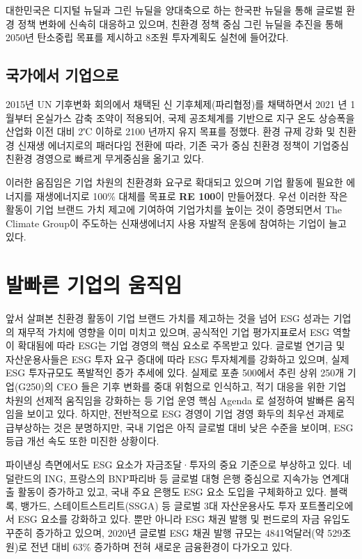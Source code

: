 \documentclass[smallextended]{svjour3}       %
\begin{document}
대한민국은 디지털 뉴딜과 그린 뉴딜을 양대축으로 하는 한국판 뉴딜을 통해
글로벌 환경 정책 변화에 신속히 대응하고 있으며, 친환경 정책 중심 그린
뉴딜을 추진을 통해 2050년 탄소중립 목표를 제시하고 8조원 투자계획도
실천에 들어갔다.

\hypertarget{companies-to-climate-change}{%
\subsection{국가에서 기업으로}\label{companies-to-climate-change}}

2015년 UN 기후변화 회의에서 채택된 신 기후체제(파리협정)를 채택하면서
2021 년 1월부터 온실가스 감축 조약이 적용되어, 국제 공조체계를 기반으로
지구 온도 상승폭을 산업화 이전 대비 2℃ 이하로 2100 년까지 유지 목표를
정했다. 환경 규제 강화 및 친환경 신재생 에너지로의 패러다임 전환에 따라,
기존 국가 중심 친환경 정책이 기업중심 친환경 경영으로 빠르게 무게중심을
옮기고 있다.

이러한 움짐임은 기업 차원의 친환경화 요구로 확대되고 있으며 기업 활동에
필요한 에너지를 재생에너지로 100\% 대체를 목표로 \textbf{RE 100}이
만들어졌다. 우선 이러한 작은 활동이 기업 브랜드 가치 제고에 기여하여
기업가치를 높이는 것이 증명되면서 The Climate Group이 주도하는
신재생에너지 사용 자발적 운동에 참여하는 기업이 늘고 있다.

\hypertarget{movement-company}{%
\section{발빠른 기업의 움직임}\label{movement-company}}

앞서 살펴본 친환경 활동이 기업 브랜드 가치를 제고하는 것을 넘어 ESG
성과는 기업의 재무적 가치에 영향을 이미 미치고 있으며, 공식적인 기업
평가지표로서 ESG 역할이 확대됨에 따라 ESG는 기업 경영의 핵심 요소로
주목받고 있다. 글로벌 연기금 및 자산운용사들은 ESG 투자 요구 증대에 따라
ESG 투자체계를 강화하고 있으며, 실제 ESG 투자규모도 폭발적인 증가 추세에
있다. 실제로 포츈 500에서 추린 상위 250개 기업(G250)의 CEO 들은 기후
변화를 중대 위험으로 인식하고, 적기 대응을 위한 기업 차원의 선제적
움직임을 강화하는 등 기업 운영 핵심 Agenda 로 설정하여 발빠른 움직임을
보이고 있다. 하지만, 전반적으로 ESG 경영이 기업 경영 화두의 최우선
과제로 급부상하는 것은 분명하지만, 국내 기업은 아직 글로벌 대비 낮은
수준을 보이며, ESG 등급 개선 속도 또한 미진한 상황이다.

파이낸싱 측면에서도 ESG 요소가 자금조달·투자의 중요 기준으로 부상하고
있다. 네덜란드의 ING, 프랑스의 BNP파리바 등 글로벌 대형 은행 중심으로
지속가능 연계대출 활동이 증가하고 있고, 국내 주요 은행도 ESG 요소 도입을
구체화하고 있다. 블랙록, 뱅가드, 스테이트스트리트(SSGA) 등 글로벌 3대
자산운용사도 투자 포트폴리오에서 ESG 요소를 강화하고 있다. 뿐만 아니라
ESG 채권 발행 및 펀드로의 자금 유입도 꾸준히 증가하고 있으며, 2020년
글로벌 ESG 채권 발행 규모는 4841억달러(약 529조원)로 전년 대비 63\%
증가하며 전혀 새로운 금융환경이 다가오고 있다.
\end{document}
